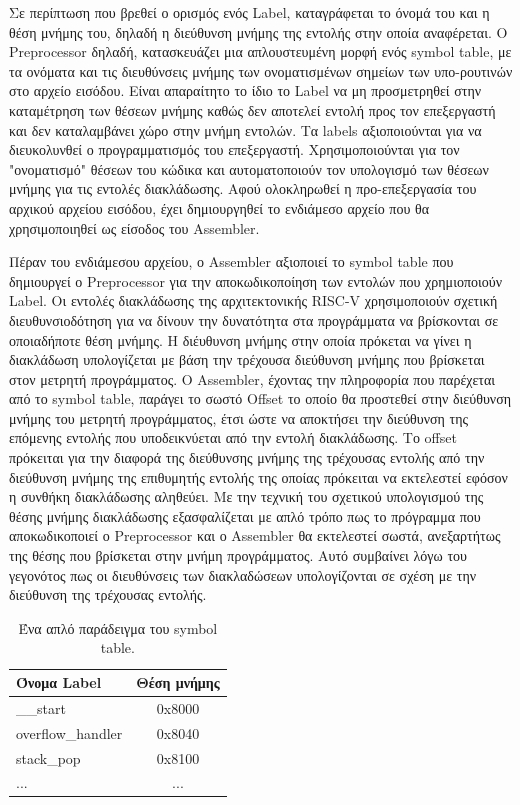 \documentclass[11pt]{extarticle}
\begin{document}
Σε περίπτωση που βρεθεί ο ορισμός ενός Label, καταγράφεται το όνομά του και η θέση μνήμης του, δηλαδή η διεύθυνση μνήμης της εντολής στην οποία αναφέρεται.
Ο Preprocessor δηλαδή, κατασκευάζει μια απλουστευμένη μορφή ενός symbol table, με τα ονόματα και τις διευθύνσεις μνήμης των ονοματισμένων σημείων των υπο-ρουτινών στο αρχείο εισόδου. 
Είναι απαραίτητο το ίδιο το Label να μη προσμετρηθεί στην καταμέτρηση των θέσεων μνήμης καθώς δεν αποτελεί εντολή προς τον επεξεργαστή και δεν καταλαμβάνει χώρο στην μνήμη εντολών.
Τα labels αξιοποιούνται για να διευκολυνθεί ο προγραμματισμός του επεξεργαστή. 
Χρησιμοποιούνται για τον "ονοματισμό" θέσεων του κώδικα και αυτοματοποιούν τον υπολογισμό των θέσεων μνήμης για τις εντολές διακλάδωσης.
Αφού ολοκληρωθεί η προ-επεξεργασία του αρχικού αρχείου εισόδου, έχει δημιουργηθεί το ενδιάμεσο αρχείο που θα χρησιμοποιηθεί ως είσοδος του Assembler.

Πέραν του ενδιάμεσου αρχείου, ο Assembler αξιοποιεί το symbol table που δημιουργεί ο Preprocessor για την αποκωδικοποίηση των εντολών που χρημιοποιούν Label.
Οι εντολές διακλάδωσης της αρχιτεκτονικής RISC-V χρησιμοποιούν σχετική διευθυνσιοδότηση για να δίνουν την δυνατότητα στα προγράμματα να βρίσκονται σε οποιαδήποτε θέση μνήμης.
Η διέυθυνση μνήμης στην οποία πρόκεται να γίνει η διακλάδωση υπολογίζεται με βάση την τρέχουσα διεύθυνση μνήμης που βρίσκεται στον μετρητή προγράμματος.
Ο Assembler, έχοντας την πληροφορία που παρέχεται από το symbol table, παράγει το σωστό Offset το οποίο θα προστεθεί στην διεύθυνση μνήμης του μετρητή προγράμματος, έτσι ώστε να αποκτήσει την διεύθυνση της επόμενης εντολής που υποδεικνύεται από την εντολή διακλάδωσης.
Το offset πρόκειται για την διαφορά της διεύθυνσης μνήμης της τρέχουσας εντολής από την διεύθυνση μνήμης της επιθυμητής εντολής της οποίας πρόκειται να εκτελεστεί εφόσον η συνθήκη διακλάδωσης αληθεύει.
Με την τεχνική του σχετικού υπολογισμού της θέσης μνήμης διακλάδωσης εξασφαλίζεται με απλό τρόπο πως το πρόγραμμα που αποκωδικοποιεί ο Preprocessor και ο Assembler θα εκτελεστεί σωστά, ανεξαρτήτως της θέσης που βρίσκεται στην μνήμη προγράμματος.
Αυτό συμβαίνει λόγω του γεγονότος πως οι διευθύνσεις των διακλαδώσεων υπολογίζονται σε σχέση με την διεύθυνση της τρέχουσας εντολής.
\begin{table}[H]
\centering
\begin{tabular}{|l|c|}
\hline
\cellcolor{lgray} \textbf{Όνομα Label} & \cellcolor{lgray} \textbf{Θέση μνήμης} \\\hline
\_\_start         & 0x8000 \\\hline
overflow\_handler & 0x8040 \\\hline
stack\_pop        & 0x8100 \\\hline
...               & ...    \\\hline
\end{tabular}
\caption[Symbol Table]{\label{tab:widgets}Ένα απλό παράδειγμα του symbol table.}
\end{table}
\end{document}
